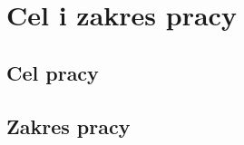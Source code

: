 \chapter{Cel i zakres pracy}
\label{chap:cel-i-zakres}

\section{Cel pracy}
\label{sec:cel-pracy}


\section{Zakres pracy}
\label{sec:zakres-pracy}

